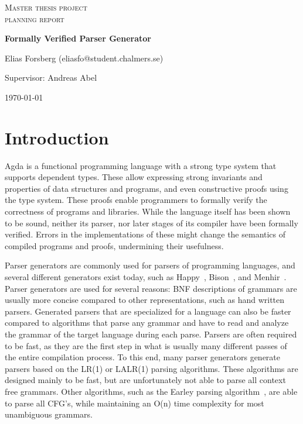 \documentclass{article}
\begin{document}
\begin{titlepage}
  

\centering
  
  
{\scshape\LARGE Master thesis project \\ planning report\\}
  
\vspace{0.5cm}
  
{\huge\bfseries Formally Verified Parser Generator\\}
  
\vspace{2cm}
  
{\Large Elias Forsberg (eliasfo@student.chalmers.se)\\}
  
\vspace{1.0cm}
  
{\large Supervisor: Andreas Abel\\}
  
\vfill
  
{\large \today\\} 

\end{titlepage}

\section{Introduction}

	Agda is a functional programming language with a strong type system that
	supports dependent types. These allow expressing strong invariants and
	properties of data structures and programs, and even constructive proofs
	using the type system. These proofs enable programmers to formally verify
	the correctness of programs and libraries. While the language itself has
	been shown to be sound, neither its parser, nor later stages of its
	compiler have been formally verified. Errors in the implementations of
	these might change the semantics of compiled programs and proofs,
	undermining their usefulness.

	Parser generators are commonly used for parsers of programming languages,
	and several different generators exist today, such as Happy~\cite{Happy},
	Bison~\cite{Bison}, and Menhir~\cite{Menhir}. Parser generators are used
	for several reasons: BNF descriptions of grammars are usually more concise
	compared to other representations, such as hand written parsers. Generated
	parsers that are specialized for a language can also be faster compared to
	algorithms that parse any grammar and have to read and analyze the grammar
	of the target language during each parse. Parsers are often required to be
	fast, as they are the first step in what is usually many different passes
	of the entire compilation process. To this end, many parser generators
	generate parsers based on the LR(1) or LALR(1) parsing algorithms. These
	algorithms are designed mainly to be fast, but are unfortunately not able
	to parse all context free grammars.  Other algorithms, such as the Earley
	parsing algorithm~\cite{Earley}, are able to parse all CFG's, while
	maintaining an O(n) time complexity for most unambiguous grammars.
\end{document}
